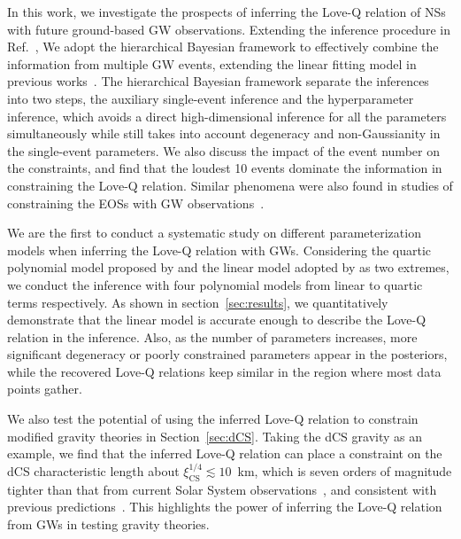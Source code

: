 \documentclass[a4paper,11pt]{article}
\begin{document}
In this work, we investigate the prospects of inferring the Love-Q relation of NSs
with future ground-based GW observations.
Extending the inference procedure in
Ref.~\cite{Samajdar:2020xrd}, 
We adopt the hierarchical Bayesian framework to effectively combine the
information from multiple GW events, extending the linear fitting model in
previous works~\cite{Samajdar:2020xrd}. The hierarchical Bayesian framework
separate the inferences into two steps, the auxiliary single-event
inference and the hyperparameter inference, which avoids a direct high-dimensional
inference for all the parameters simultaneously while still takes into account
degeneracy and non-Gaussianity in the single-event parameters. We also discuss
the impact of the event number on the constraints, and find that the loudest 10 events
dominate the information in constraining the Love-Q relation. Similar phenomena
were also found in studies of constraining the EOSs with GW observations~\cite{Lackey:2014fwa,Landry:2020vaw,Pang:2020ilf,Finstad:2022oni,Bandopadhyay:2024zrr,Wang:2024xon}.

We are the first to conduct a systematic study on different parameterization models
when inferring the Love-Q relation with GWs. Considering the quartic polynomial
model proposed by \citet{Yagi:2013awa} and the linear model adopted by
\citet{Samajdar:2020xrd} as two extremes, we conduct the inference with
four polynomial models
from linear to quartic terms respectively. As shown in 
section~\ref{sec:results}, we quantitatively demonstrate that 
the linear model is accurate enough to describe the Love-Q relation in the 
inference. Also, as the number of parameters increases, more significant 
degeneracy or poorly constrained parameters appear in the posteriors, while the recovered Love-Q relations keep similar in the region where most data points gather.

We also test the potential of using the inferred Love-Q relation to
constrain modified gravity theories in Section~\ref{sec:dCS}.
Taking the dCS gravity as an example, we find that the inferred Love-Q relation
can place a constraint on the dCS characteristic length about
$\xi_{\mathrm{CS}}^{1/4} \lesssim 10$~km, which is seven orders
of magnitude tighter than that from current Solar System
observations~\cite{Ali-Haimoud:2011zme,Yagi:2012ya}, and consistent with
previous predictions~\cite{Yagi:2013bca,Yagi:2013awa}. This highlights the power
of inferring the Love-Q relation from GWs in testing gravity theories. 
\end{document}
